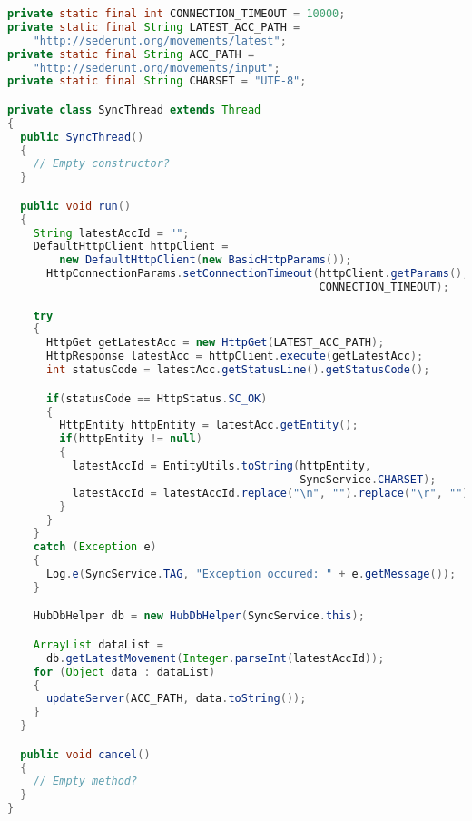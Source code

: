 \documentclass[11pt, a4paper, oneside, english]{scrbook}
\begin{document}
\begin{lstlisting}[language=Java, numbers=none]
private static final int CONNECTION_TIMEOUT = 10000;
private static final String LATEST_ACC_PATH =
    "http://sederunt.org/movements/latest";
private static final String ACC_PATH =
    "http://sederunt.org/movements/input";
private static final String CHARSET = "UTF-8";

private class SyncThread extends Thread
{
  public SyncThread()
  {
    // Empty constructor?
  }

  public void run()
  {
    String latestAccId = "";
    DefaultHttpClient httpClient =
        new DefaultHttpClient(new BasicHttpParams());
      HttpConnectionParams.setConnectionTimeout(httpClient.getParams(),
                                                CONNECTION_TIMEOUT);

    try
    {
      HttpGet getLatestAcc = new HttpGet(LATEST_ACC_PATH);
      HttpResponse latestAcc = httpClient.execute(getLatestAcc);
      int statusCode = latestAcc.getStatusLine().getStatusCode();

      if(statusCode == HttpStatus.SC_OK)
      {
        HttpEntity httpEntity = latestAcc.getEntity();
        if(httpEntity != null)
        {
          latestAccId = EntityUtils.toString(httpEntity,
                                             SyncService.CHARSET);
          latestAccId = latestAccId.replace("\n", "").replace("\r", "");
        }
      }
    }
    catch (Exception e)
    {
      Log.e(SyncService.TAG, "Exception occured: " + e.getMessage());
    }

    HubDbHelper db = new HubDbHelper(SyncService.this);

    ArrayList dataList =
      db.getLatestMovement(Integer.parseInt(latestAccId));
    for (Object data : dataList)
    {
      updateServer(ACC_PATH, data.toString());
    }
  }

  public void cancel()
  {
    // Empty method?
  }
}
\end{lstlisting}
\end{document}
